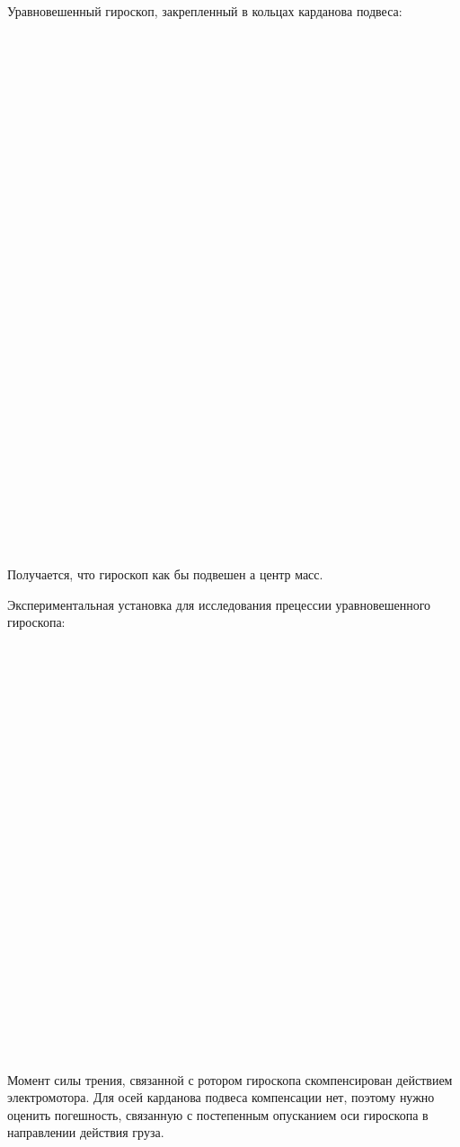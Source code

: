 \documentclass[a4paper, 12pt]{article}%
\begin{document}
Уравновешенный гироскоп, закрепленный в кольцах карданова подвеса:
\\
\\
\\ \\ \\ \\ \\ \\ \\ \\ \\ \\ \\ \\ \\
\\ \\ \\ \\ \\ \\ \\ \\ \\ \\ \\ \\ \\
\\ \\ \\ 
\\
Получается, что гироскоп как бы подвешен а центр масс.

Экспериментальная установка для исследования прецессии уравновешенного гироскопа:
\\ \\ \\ \\ \\ \\ \\ \\ \\ \\ \\ \\ \\
\\ \\ \\ \\ \\ \\ \\ \\ \\ \\ \\ \\ \\
Момент силы трения, связанной с ротором гироскопа скомпенсирован действием электромотора. Для осей карданова подвеса компенсации нет, поэтому нужно оценить погешность, связанную с постепенным опусканием оси гироскопа в направлении действия груза. 
\end{document}
